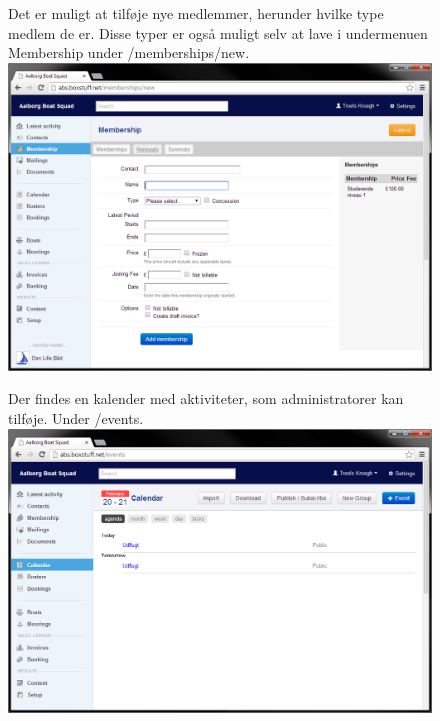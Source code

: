 \begin{figure}
	Det er muligt at tilføje nye medlemmer, herunder hvilke type medlem de er. Disse typer er også muligt selv at lave i undermenuen Membership under /memberships/new.\newline
	\includegraphics[scale=0.5]{images/teknologi/_AddMember}
\end{figure}

\begin{figure}
	Der findes en kalender med aktiviteter, som administratorer kan tilføje. Under /events.\newline
	\includegraphics[scale=0.5]{images/teknologi/_Calendar}
\end{figure}

